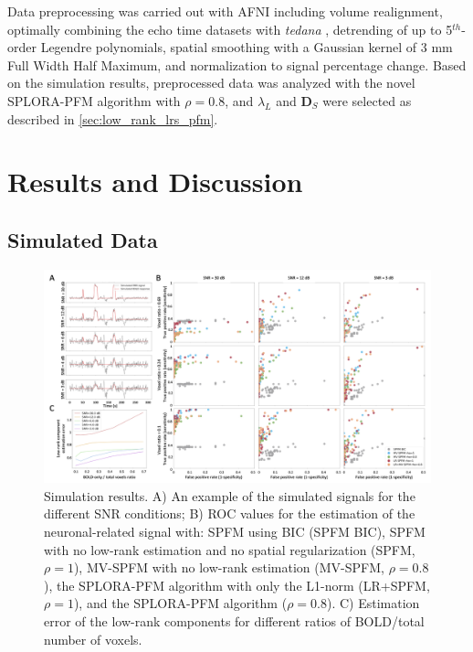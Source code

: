 Data preprocessing was carried out with AFNI \citep{Cox1996AFNISoftwareAnalysis}
including volume realignment, optimally combining the echo time datasets with
\textit{tedana} \citep{DuPre2021TEdependentanalysis}, detrending of up to
5$^{th}$-order Legendre polynomials, spatial smoothing with a Gaussian kernel of
3 mm Full Width Half Maximum, and normalization to signal percentage change.
Based on the simulation results, preprocessed data was analyzed with the novel
SPLORA-PFM algorithm with $\rho = 0.8$, and $\lambda_L$ and $\mathbf{D}_S$ were
selected as described in \cref{sec:low_rank_lrs_pfm}.

\section{Results and Discussion}
\label{sec:low_rank_results}

\subsection{Simulated Data}

\begin{figure}[th!]
    \centering
    \includegraphics[width=\textwidth]{figures/low_rank/figure_1_v6.png}
    \caption{Simulation results. A) An example of the simulated signals for the
    different SNR conditions; B) ROC values for the estimation of
    the neuronal-related signal with: SPFM using BIC (SPFM BIC),
    SPFM with no low-rank estimation and no spatial regularization (SPFM,
    $\rho=1$), MV-SPFM with no low-rank estimation (MV-SPFM, $\rho = 0.8$), the
    SPLORA-PFM algorithm with only the L1-norm (LR+SPFM, $\rho=1$), and the
    SPLORA-PFM algorithm ($\rho = 0.8$). C) Estimation error of the low-rank
    components for different ratios of BOLD/total number of voxels.}
    \label{fig:low_rank_1}
\end{figure}

